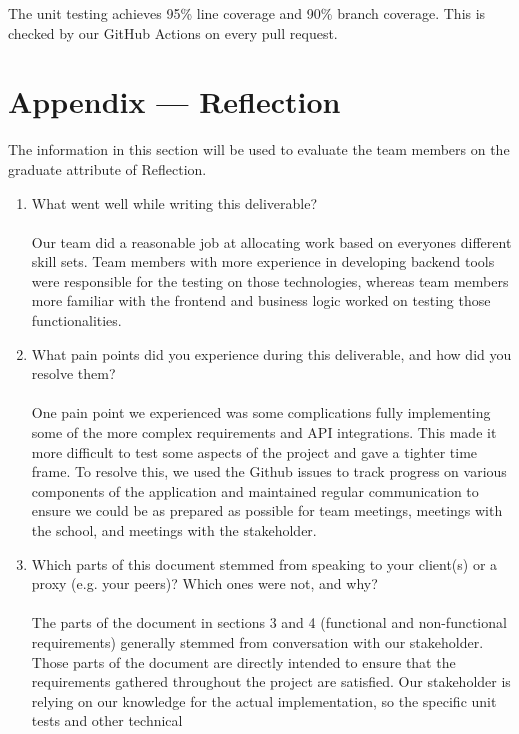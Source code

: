 \documentclass[12pt, titlepage]{article}
\begin{document}
The unit testing achieves 95\% line coverage and 90\% branch
coverage. This is checked by our GitHub Actions on every pull request.




\newpage{}
\section*{Appendix --- Reflection}

The information in this section will be used to evaluate the team members on the
graduate attribute of Reflection.



\begin{enumerate}
  \item What went well while writing this deliverable?\\
  \\
  Our team did a reasonable job at allocating work based on everyones different skill sets. Team members with more experience in
  developing backend tools were responsible for the testing on those technologies, whereas team members more familiar with the frontend
  and business logic worked on testing those functionalities.
  \item What pain points did you experience during this deliverable, and how
    did you resolve them?\\
  \\
  One pain point we experienced was some complications fully implementing some of the more complex requirements and API integrations.
  This made it more difficult to test some aspects of the project and gave a tighter time frame. To resolve this, we used the Github
  issues to track progress on various components of the application and maintained regular communication to ensure we could
  be as prepared as possible for team meetings, meetings with the school, and meetings with the stakeholder.
  \item Which parts of this document stemmed from speaking to your client(s) or
    a proxy (e.g. your peers)? Which ones were not, and why?\\
    \\
    The parts of the document in sections 3 and 4 (functional and non-functional requirements) generally stemmed from conversation
    with our stakeholder. Those parts of the document are directly intended to ensure that the requirements gathered throughout the project
    are satisfied. Our stakeholder is relying on our knowledge for the actual implementation, so the specific unit tests and other technical

\end{enumerate}
\end{document}
